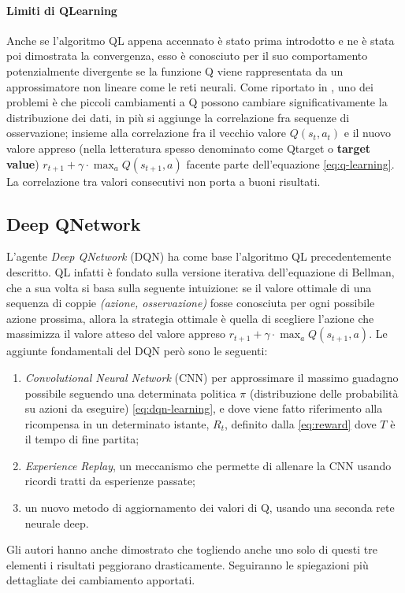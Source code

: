 \documentclass[twoside,twocolumn,10pt]{extarticle}
\theoremstyle{definition}
\begin{document}
		\paragraph{Limiti di Q\texttwelveudash Learning} Anche se l'algoritmo QL appena accennato è stato prima introdotto e ne è stata poi dimostrata la convergenza, esso è conosciuto per il suo comportamento potenzialmente divergente se la funzione Q viene rappresentata da un approssimatore non lineare come le reti neurali. Come riportato in \cite{bib:dqn}, uno dei problemi è che piccoli cambiamenti a Q possono cambiare significativamente la distribuzione dei dati, in più si aggiunge la correlazione fra sequenze di osservazione; insieme alla correlazione fra il vecchio valore $Q(s_t, a_t)$ e il nuovo valore appreso (nella letteratura spesso denominato come Q\texttwelveudash target o \textbf{target value}) $r_{t + 1} + \gamma \cdot \max_a Q(s_{t + 1}, a)$ facente parte dell'equazione \ref{eq:q-learning}. La correlazione tra valori consecutivi non porta a buoni risultati.
		
	\subsection{Deep Q\texttwelveudash Network}
		L'agente \textit{Deep Q\texttwelveudash Network} (DQN) ha come base l'algoritmo QL precedentemente descritto. QL infatti è fondato sulla versione iterativa dell'equazione di Bellman, che a sua volta si basa sulla seguente intuizione: se il valore ottimale di una sequenza di coppie \textit{(azione, osservazione)} fosse conosciuta per ogni possibile azione prossima, allora la strategia ottimale è quella di scegliere l'azione che massimizza il valore atteso del valore appreso $r_{t + 1} + \gamma \cdot \max_a Q(s_{t + 1}, a)$. Le aggiunte fondamentali del DQN però sono le seguenti:
		\begin{enumerate}
			\item \textit{Convolutional Neural Network} (CNN) per approssimare il massimo guadagno possibile seguendo una determinata politica $\pi$ (distribuzione delle probabilità su azioni da eseguire) \ref{eq:dqn-learning}, e dove viene fatto riferimento alla ricompensa in un determinato istante, $R_t$, definito dalla \ref{eq:reward} dove $T$ è il tempo di fine partita;
			\item \textit{Experience Replay}, un meccanismo che permette di allenare la CNN usando ricordi tratti da esperienze passate;
			\item un nuovo metodo di aggiornamento dei valori di Q, usando una seconda rete neurale deep.
		\end{enumerate}
		Gli autori hanno anche dimostrato che togliendo anche uno solo di questi tre elementi i risultati peggiorano drasticamente. Seguiranno le spiegazioni più dettagliate dei cambiamento apportati.
\end{document}
